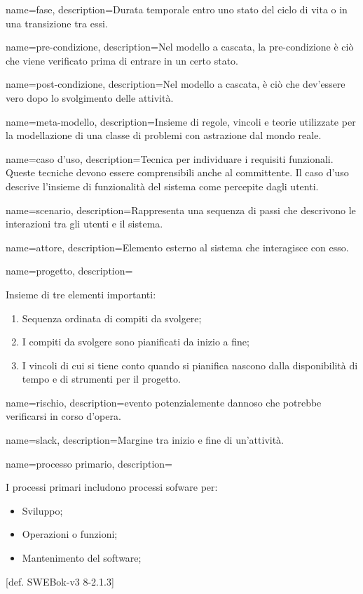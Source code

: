 {
name=fase,
description={Durata temporale entro uno stato del ciclo di vita o in una transizione tra essi.}
}


{
name=pre-condizione,
description={Nel modello a cascata, la pre-condizione \`e ci\`o che viene verificato prima di entrare in un certo stato.}
}

{
name=post-condizione,
description={Nel modello a cascata, \`e ci\`o che dev'essere vero dopo lo svolgimento delle attivit\`a.}
}

{
name=meta-modello,
description={Insieme di regole, vincoli e teorie utilizzate per la modellazione di una classe di problemi con astrazione dal mondo reale.}
}

{
name=caso d'uso,
description={Tecnica per individuare i requisiti funzionali. Queste tecniche devono essere comprensibili anche al committente. Il caso d'uso descrive l'insieme di funzionalit\`a del sistema come percepite dagli utenti.}
}

{
name=scenario,
description={Rappresenta una sequenza di passi che descrivono le interazioni tra gli utenti e il sistema.}
}

{
name=attore,
description={Elemento esterno al sistema che interagisce con esso.}
}

{
name=progetto,
description={Insieme di tre elementi importanti: \begin{enumerate}
\item Sequenza ordinata di compiti da svolgere;
\item I compiti da svolgere sono pianificati da inizio a fine;
\item I vincoli di cui si tiene conto quando si pianifica nascono dalla disponibilità di tempo e di strumenti per il progetto.
\end{enumerate}
}
}

{
name=rischio,
description={evento potenzialemente dannoso che potrebbe verificarsi in corso d'opera.}
}

{
name=slack,
description={Margine tra inizio e fine di un'attivit\`a.}
}

{
name=processo primario,
description={I processi primari includono processi sofware per: \begin{itemize}
\item Sviluppo;
\item Operazioni o funzioni;
\item Mantenimento del software;
\end{itemize}
[def. SWEBok-v3 8-2.1.3]}
}

